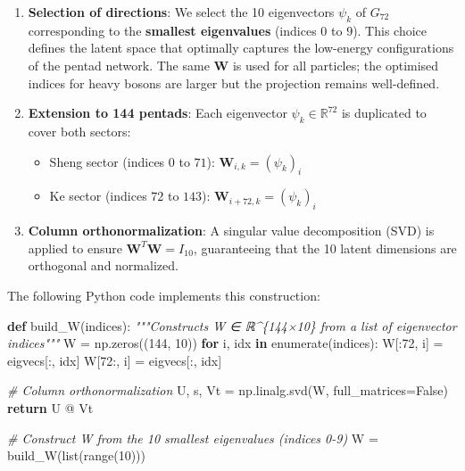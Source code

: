 \documentclass[11pt]{article}
\providecommand{\tightlist}{\setlength{\itemsep}{2pt}\setlength{\parskip}{6pt}}
\providecommand{\tightlist}{%
  \setlength{\itemsep}{2pt}\setlength{\parskip}{6pt}
}
\newenvironment{Shaded}{}{}
\newcommand{\BuiltInTok}[1]{\textcolor[rgb]{0.00,0.50,0.00}{#1}}
\newcommand{\CommentTok}[1]{\textcolor[rgb]{0.38,0.63,0.69}{\textit{#1}}}
\newcommand{\ControlFlowTok}[1]{\textcolor[rgb]{0.00,0.44,0.13}{\textbf{#1}}}
\newcommand{\DecValTok}[1]{\textcolor[rgb]{0.25,0.63,0.44}{#1}}
\newcommand{\KeywordTok}[1]{\textcolor[rgb]{0.00,0.44,0.13}{\textbf{#1}}}
\newcommand{\NormalTok}[1]{#1}
\newcommand{\OperatorTok}[1]{\textcolor[rgb]{0.40,0.40,0.40}{#1}}
\newcommand{\VariableTok}[1]{\textcolor[rgb]{0.10,0.09,0.49}{#1}}
\begin{document}
\begin{enumerate}
\def\labelenumi{\arabic{enumi}.}
\item
  \textbf{Selection of directions}: We select the 10 eigenvectors
  \(\psi_k\) of \(G_{72}\) corresponding to the \textbf{smallest
  eigenvalues} (indices \(0\) to \(9\)). This choice defines the latent
  space that optimally captures the low-energy configurations of the
  pentad network. The same \(\mathbf{W}\) is used for all particles; the
  optimised indices for heavy bosons are larger but the projection
  remains well-defined.
\item
  \textbf{Extension to 144 pentads}: Each eigenvector
  \(\psi_k \in \mathbb{R}^{72}\) is duplicated to cover both sectors:

  \begin{itemize}
  \tightlist
  \item
    Sheng sector (indices \(0\) to \(71\)):
    \(\mathbf{W}_{i,k} = (\psi_k)_i\)
  \item
    Ke sector (indices \(72\) to \(143\)):
    \(\mathbf{W}_{i+72,k} = (\psi_k)_i\)
  \end{itemize}
\item
  \textbf{Column orthonormalization}: A singular value decomposition
  (SVD) is applied to ensure \(\mathbf{W}^T \mathbf{W} = I_{10}\),
  guaranteeing that the 10 latent dimensions are orthogonal and
  normalized.
\end{enumerate}

The following Python code implements this construction:

\begin{Shaded}
\begin{Highlighting}[]
\KeywordTok{def}\NormalTok{ build\_W(indices):}
    \CommentTok{"""Constructs W ∈ ℝ\^{}\{144×10\} from a list of eigenvector indices"""}
\NormalTok{    W }\OperatorTok{=}\NormalTok{ np.zeros((}\DecValTok{144}\NormalTok{, }\DecValTok{10}\NormalTok{))}
    \ControlFlowTok{for}\NormalTok{ i, idx }\KeywordTok{in} \BuiltInTok{enumerate}\NormalTok{(indices):}
\NormalTok{        W[:}\DecValTok{72}\NormalTok{, i] }\OperatorTok{=}\NormalTok{ eigvecs[:, idx]}
\NormalTok{        W[}\DecValTok{72}\NormalTok{:, i] }\OperatorTok{=}\NormalTok{ eigvecs[:, idx]}
    
    \CommentTok{\# Column orthonormalization}
\NormalTok{    U, s, Vt }\OperatorTok{=}\NormalTok{ np.linalg.svd(W, full\_matrices}\OperatorTok{=}\VariableTok{False}\NormalTok{)}
    \ControlFlowTok{return}\NormalTok{ U }\OperatorTok{@}\NormalTok{ Vt}

\CommentTok{\# Construct W from the 10 smallest eigenvalues (indices 0{-}9)}
\NormalTok{W }\OperatorTok{=}\NormalTok{ build\_W(}\BuiltInTok{list}\NormalTok{(}\BuiltInTok{range}\NormalTok{(}\DecValTok{10}\NormalTok{)))}
\end{Highlighting}
\end{Shaded}
\end{document}
